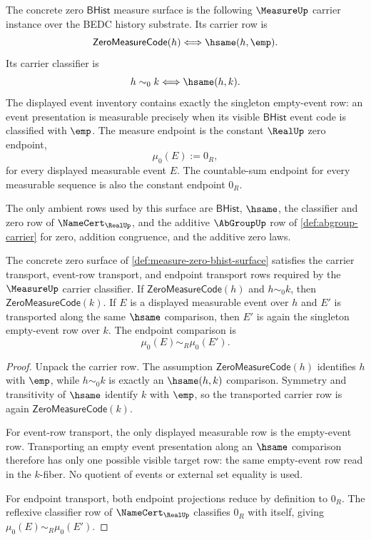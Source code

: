 \begin{definition}
\label{def:measure-zero-bhist-surface}
The concrete zero $\mathsf{BHist}$ measure surface is the following
$\MeasureUp$ carrier instance over the BEDC history substrate. Its carrier row is
$$
\mathsf{ZeroMeasureCode}(h)\Longleftrightarrow \hsame(h,\emp).
$$
Its carrier classifier is
$$
h\sim_0 k \Longleftrightarrow \hsame(h,k).
$$
The displayed event inventory contains exactly the singleton empty-event row:
an event presentation is measurable precisely when its visible
$\mathsf{BHist}$ event code is classified with $\emp$. The measure endpoint is
the constant $\RealUp$ zero endpoint,
$$
\mu_0(E):=0_R,
$$
for every displayed measurable event $E$. The countable-sum endpoint for every
measurable sequence is also the constant endpoint $0_R$.

The only ambient rows used by this surface are $\mathsf{BHist}$,
$\hsame$, the classifier and zero row of $\NameCert_{\RealUp}$, and the
additive $\AbGroupUp$ row of \autoref{def:abgroup-carrier} for zero, addition
congruence, and the additive zero laws.
\end{definition}

\begin{theorem}
\label{thm:measure-zero-bhist-carrier-classifier-stability}
The concrete zero surface of
\autoref{def:measure-zero-bhist-surface} satisfies the carrier transport,
event-row transport, and endpoint transport rows required by the $\MeasureUp$
carrier classifier. If $\mathsf{ZeroMeasureCode}(h)$ and $h\sim_0 k$, then
$\mathsf{ZeroMeasureCode}(k)$. If $E$ is a displayed measurable event over
$h$ and $E'$ is transported along the same $\hsame$ comparison, then $E'$ is
again the singleton empty-event row over $k$. The endpoint comparison is
$$
\mu_0(E)\sim_R\mu_0(E').
$$
\end{theorem}
\begin{proof}
Unpack the carrier row. The assumption
$\mathsf{ZeroMeasureCode}(h)$ identifies $h$ with $\emp$, while $h\sim_0 k$
is exactly an $\hsame(h,k)$ comparison. Symmetry and transitivity of
$\hsame$ identify $k$ with $\emp$, so the transported carrier row is again
$\mathsf{ZeroMeasureCode}(k)$.

For event-row transport, the only displayed measurable row is the empty-event
row. Transporting an empty event presentation along an $\hsame$ comparison
therefore has only one possible visible target row: the same empty-event row
read in the $k$-fiber. No quotient of events or external set equality is used.

For endpoint transport, both endpoint projections reduce by definition to
$0_R$. The reflexive classifier row of $\NameCert_{\RealUp}$ classifies
$0_R$ with itself, giving $\mu_0(E)\sim_R\mu_0(E')$.
\end{proof}

